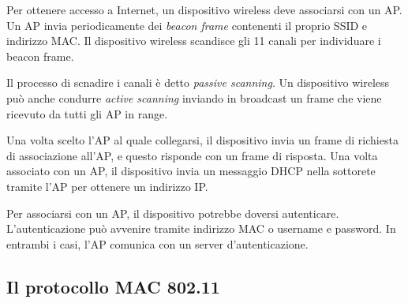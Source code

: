 \documentclass[11pt]{book}
\begin{document}
Per ottenere accesso a Internet, un dispositivo wireless deve associarsi con un AP. Un AP invia periodicamente dei 
\textit{beacon frame} contenenti il proprio SSID e indirizzo MAC. Il dispositivo wireless scandisce gli 11 canali per 
individuare i beacon frame. 

Il processo di scnadire i canali è detto \textit{passive scanning}. Un dispositivo wireless può anche condurre \textit{active 
scanning} inviando in broadcast un frame che viene ricevuto da tutti gli AP in range.

Una volta scelto l'AP al quale collegarsi, il dispositivo invia un frame di richiesta di associazione all'AP, e questo 
risponde con un frame di risposta. Una volta associato con un AP, il dispositivo invia un messaggio DHCP nella sottorete 
tramite l'AP per ottenere un indirizzo IP.

Per associarsi con un AP, il dispositivo potrebbe doversi autenticare. L'autenticazione può avvenire tramite indirizzo MAC 
o username e password. In entrambi i casi, l'AP comunica con un server d'autenticazione.
\subsection{Il protocollo MAC 802.11}
\end{document}
